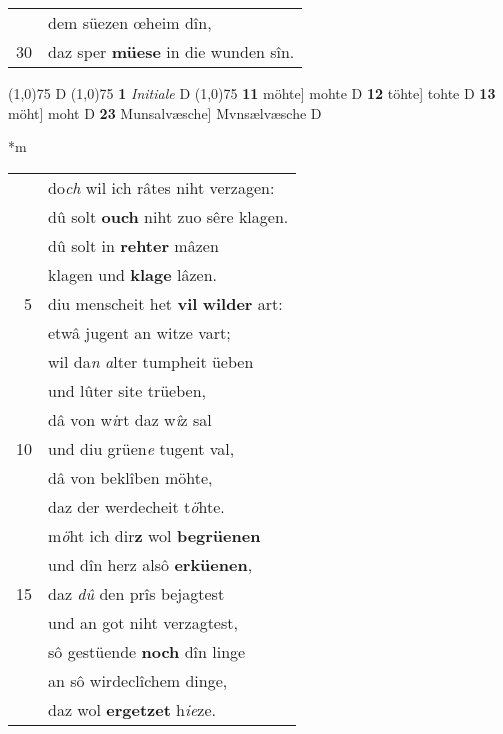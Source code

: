 \documentclass[8pt,a4paper,notitlepage]{article}
\begin{document}
\begin{table}[ht]
\begin{minipage}[t]{0.5\linewidth}
\begin{tabular}{rl}
 & dem süezen œheim dîn,\\ 
30 & daz sper \textbf{müese} in die wunden sîn.\\ 
\end{tabular}
\scriptsize
\line(1,0){75} \newline
D \newline
\line(1,0){75} \newline
\textbf{1} \textit{Initiale} D  \newline
\line(1,0){75} \newline
\textbf{11} möhte] mohte D \textbf{12} töhte] tohte D \textbf{13} möht] moht D \textbf{23} Munsalvæsche] Mvnsælvæsche D \newline
\end{minipage}
\hspace{0.5cm}
\begin{minipage}[t]{0.5\linewidth}
\small
\begin{center}*m
\end{center}
\begin{tabular}{rl}
 & do\textit{ch} wil ich râtes niht verzagen:\\ 
 & dû solt \textbf{ouch} niht zuo sêre klagen.\\ 
 & dû solt in \textbf{rehter} mâzen\\ 
 & klagen und \textbf{klage} lâzen.\\ 
5 & diu menscheit het \textbf{vil} \textbf{wilder} art:\\ 
 & etwâ  jugent an witze vart;\\ 
 & wil da\textit{n} \textit{a}lter tumpheit üeben\\ 
 & und lûter site trüeben,\\ 
 & dâ von w\textit{i}rt daz w\textit{î}z sal\\ 
10 & und diu grüen\textit{e} tugent val,\\ 
 & dâ von beklîben möhte,\\ 
 & daz der werdecheit t\textit{ö}hte.\\ 
 & m\textit{ö}ht ich dir\textbf{z} wol \textbf{begrüenen}\\ 
 & und dîn herz alsô \textbf{erküenen},\\ 
15 & daz \textit{dû} den prîs bejagtest\\ 
 & und an got niht verzagtest,\\ 
 & sô gestüende \textbf{noch} dîn linge\\ 
 & an sô wirdeclîchem dinge,\\ 
 & daz wol \textbf{ergetzet} h\textit{ie}ze.\\ 

\end{tabular}
\end{minipage}
\end{table}
\end{document}
